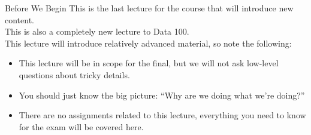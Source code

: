 \documentclass[aspectratio=169]{../latex_main/tntbeamer}  %
\begin{document}
	
	\begin{frame}{Before We Begin}
	    This is the last lecture for the course that will introduce new content.\\
        This is also a completely new lecture to Data 100.\\
        This lecture will introduce relatively advanced material, so note the following:
        \begin{itemize}
            \item This lecture will be in scope for the final, but we will not ask low-level questions about tricky details.
            \item You should just know the big picture: “Why are we doing what we’re doing?”
            \item There are no assignments related to this lecture, everything you need to know for the exam will be covered here.
        \end{itemize}
	\end{frame}
\end{document}
